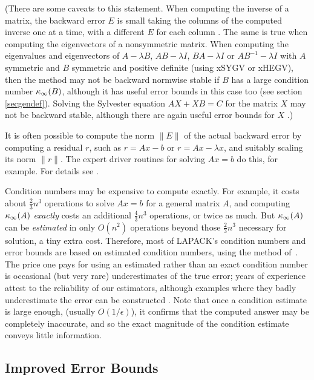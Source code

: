 (There are some
caveats to this statement. When computing the inverse of a matrix,
the backward error $E$ is small taking the
columns of the computed inverse one at
a time, with a different $E$ for each column \cite{lapwn27}.
The same is true when computing
the eigenvectors of a nonsymmetric matrix.
When computing the eigenvalues and eigenvectors
of $A- \lambda B$, $AB- \lambda I$, $BA- \lambda I$ or $A B^{-1} - \lambda I$
with $A$ symmetric and $B$ symmetric and positive definite
(using xSYGV or xHEGV), then the method may not be backward normwise stable if
$B$ has a large condition number $\kappa_{\infty} (B)$,
although it has useful error bounds in this case too
(see section \ref{secgendef}). Solving the Sylvester equation
$AX+XB=C$ for the matrix $X$ may not be backward stable, although
there are again useful error bounds for $X$ \cite{higham93}.)

It is often possible to compute the norm $\|E\|$ of the actual backward
error by computing a residual $r$, such as $r=Ax-b$ or $r=Ax - \lambda x$,
and suitably scaling its norm $\|r\|$. The expert driver routines for
solving $Ax=b$ do this, for example.
For details see \cite{GVL2,higham02,parlett,stewartsun90}.

Condition numbers may be expensive to compute
exactly.
For example, it costs about $\frac{2}{3} n^3$ operations to solve $Ax=b$
for a general matrix $A$, and computing $\kappa_{\infty} (A)$ {\em exactly} costs
an additional $\frac{4}{3} n^3$ operations, or twice as much.
But $\kappa_{\infty} (A)$ can be {\em estimated} in only $O(n^2)$
operations beyond those $\frac{2}{3} n^3$ necessary for solution,
a tiny extra cost.  Therefore, most of LAPACK's condition numbers
and error bounds are based on estimated condition
numbers, using the method
of~\cite{hager84,higham1,nick2}.
The price one pays for using an estimated rather than an
exact condition number is occasional
(but very rare) underestimates of the true error; years of experience
attest to the reliability of our estimators, although examples
where they badly underestimate the error can be constructed \cite{higham90}.
Note that once a condition estimate is large enough,
(usually $O( 1/ \epsilon )$), it confirms that the computed
answer may be completely inaccurate, and so the exact magnitude
of the condition estimate conveys little information.

\subsection{Improved Error Bounds}\label{seccomponentwise}


